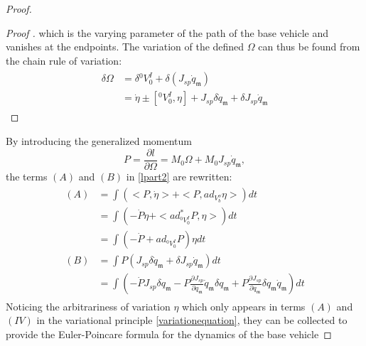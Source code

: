 \documentclass[lettersize,journal]{IEEEtran}
\begin{document}
\begin{proof}[Proof]
\begin{proof}[Proof ]
which is the varying parameter of the path of the base vehicle and vanishes at the endpoints. The variation of the defined $\Omega$ can thus be found from the chain rule of variation:
\begin{align}
\begin{split}
    \delta \Omega &= \delta {}^0V^I_0+ \delta (J_{sp}\dot{q}_\mathfrak{m})\\
    &= \dot{\eta}\pm [{}^0V^I_0,\eta] + J_{sp}\delta \dot{q}_\mathfrak{m}+\delta J_{sp}\dot{q}_\mathfrak{m}
    \end{split}
\end{align}
\end{proof}
By introducing the generalized momentum
\begin{equation}
    P=\frac{\partial l}{\partial \Omega}=M_0 \Omega + M_0 J_{sp}\dot{q}_\mathfrak{m},
\end{equation}
the terms $(A)$ and $(B)$ in \eqref{lpart2} are rewritten:
\begin{align}
\begin{split}
    (A) &= \int (<P,\dot{\eta}>+ <P,ad_{V^o_b}\eta>)dt\\
        &= \int (-\dot{P}\eta+<ad^*_{^0V^I_0}P,\eta>)dt\\
        &= \int (-\dot{P}+ad_{{}^0V^I_0}P)\eta dt\\
    (B) &= \int P(J_{sp}\delta \dot{q}_\mathfrak{m}+\delta J_{sp}\dot{q}_\mathfrak{m})dt\\
        &= \int (-\dot{P}J_{sp}\delta q_\mathfrak{m}-P\frac{\partial J_{sp}}{\partial q_\mathfrak{m}}\dot{q}_\mathfrak{m}\delta q_\mathfrak{m}+P\frac{\partial J_{sp}}{\partial q_\mathfrak{m}}\delta q_\mathfrak{m} \dot{q}_\mathfrak{m})dt
        \label{AandB}
\end{split}
\end{align}
Noticing the arbitrariness of variation $\eta$ which only appears in terms $(A)$ and $(IV)$ in the variational principle \eqref{variationequation}, they can be collected to provide the Euler-Poincare formula for the dynamics of the base vehicle

\end{proof}
\end{document}
